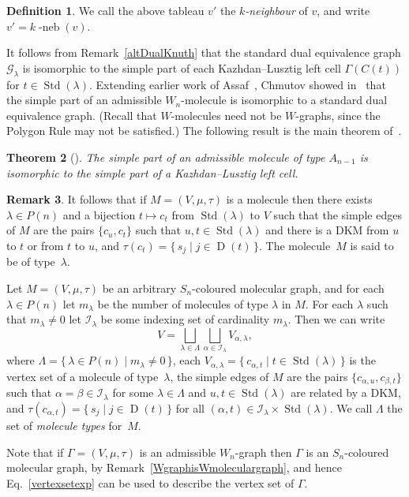 \documentclass[10pt]{amsart}
\newtheorem{theo}{Theorem}[section]
\theoremstyle{definition}
\newtheorem{defi}[theo]{Definition}
\newtheorem{rema}[theo]{Remark}
\newcommand{\citex}[2]{\cite[#1]{#2}}
\DeclareMathOperator{\STD}{Std}
\DeclareMathOperator{\neb}{-neb}
\DeclareMathOperator{\D}{D}
\begin{document}
\begin{defi}\label{k-neighbourdefinition}
We call the above tableau $v'$ the \emph{$k$-neighbour} of $v$, and write
$v'=k\neb(v)$.
\end{defi}
It follows from Remark~\ref{altDualKnuth} that the standard
dual equivalence graph $\mathcal{G}_{\lambda}$ is isomorphic to
the simple part of each Kazhdan--Lusztig left cell $\Gamma(C(t))$ for
$t\in\STD(\lambda)$.
Extending earlier work of Assaf~\cite{assaf:dualequigraphs}, Chmutov showed
in~\cite{ChuMic:typeAMol} that the simple part of an admissible $W_n$-molecule
is isomorphic to a standard dual equivalence graph. (Recall that
$W\!$-molecules need not be $W\!$-graphs, since the
Polygon Rule may not be satisfied.) The following result is
the main theorem of~\cite{ChuMic:typeAMol}.

\begin{theo}[{\citex{Theorem~2}{ChuMic:typeAMol}}]\label{molIsKL}
The simple part of an admissible molecule of type $A_{n-1}$ is
isomorphic to the simple part of a Kazhdan--Lusztig left cell.
\end{theo}

\begin{rema}\label{vertexsetofWngraph}
It follows that if $M=(V,\mu,\tau)$ is a molecule then there exists $\lambda\in P(n)$ and
a bijection $t\mapsto c_t$ from $\STD(\lambda)$ to $V$ such that
the simple edges of $M$ are the pairs $\{c_u,c_t\}$ such that $u,t\in\STD(\lambda)$ and there is a
DKM from $u$ to $t$ or from $t$ to $u$, and $\tau(c_t)=\{\,s_j\mid j\in\D(t)\,\}$.
The molecule~$M$ is said to be of type~$\lambda$.

Let $M=(V,\mu,\tau)$ be an arbitrary $S_n$-coloured molecular graph, and for
each $\lambda\in P(n)$ let $m_{\lambda}$
be the number of molecules of type $\lambda$ in $M$. For each $\lambda$ such
that $m_{\lambda}\neq 0$ let $\mathcal{I}_{\lambda}$ be some indexing set of
cardinality $m_{\lambda}$. Then we can write
\begin{equation}\label{vertexsetexp}
V = \bigsqcup_{\lambda\in\Lambda}\bigsqcup_{\alpha\in\mathcal{I}_{\lambda}}V_{\alpha,\lambda},
\end{equation}
where $\Lambda=\{\,\lambda\in P(n)\mid m_{\lambda}\neq 0\,\}$, each
$V_{\alpha,\lambda}=\{\,c_{\alpha,t}\mid t\in\STD(\lambda)\,\}$ is the vertex set
of a molecule of type~$\lambda$, the simple edges of $M$ are the pairs
$\{c_{\alpha,u},c_{\beta,t}\}$ such that $\alpha=\beta\in\mathcal{I}_{\lambda}$
for some $\lambda\in\Lambda$ and $u,t\in\STD(\lambda)$ are related by a
DKM, and $\tau(c_{\alpha,t})=\{\,s_j\mid j\in\D(t)\,\}$ for all $(\alpha,t)\in\mathcal{I}_\lambda\times\STD(\lambda)$.
We call $\Lambda$ the set of \emph{molecule types} for~$M$.

Note that if $\Gamma=(V,\mu,\tau)$ is an admissible $W_n$-graph then $\Gamma$
is an $S_n$-coloured molecular graph, by Remark~\ref{WgraphisWmoleculargraph}, and
hence Eq.~\eqref{vertexsetexp} can be used to describe the vertex set of $\Gamma$.
\end{rema}
\end{document}
